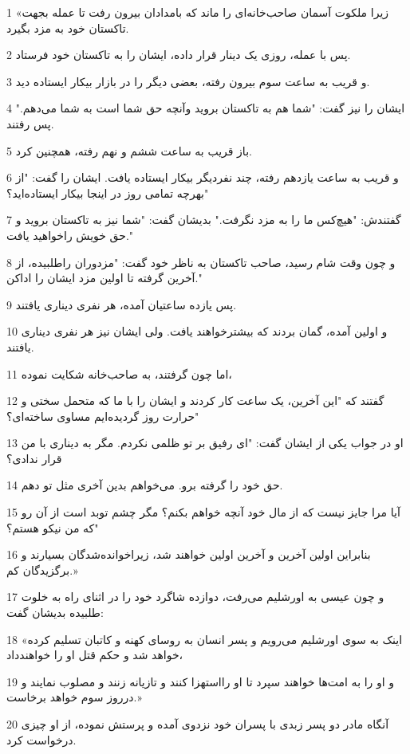 \par 1 «زیرا ملکوت آسمان صاحب‌خانه‌ای را ماند که بامدادان بیرون رفت تا عمله بجهت تاکستان خود به مزد بگیرد.
\par 2 پس با عمله، روزی یک دینار قرار داده، ایشان را به تاکستان خود فرستاد.
\par 3 و قریب به ساعت سوم بیرون رفته، بعضی دیگر را در بازار بیکار ایستاده دید.
\par 4 ایشان را نیز گفت: "شما هم به تاکستان بروید وآنچه حق شما است به شما می‌دهم." پس رفتند.
\par 5 باز قریب به ساعت ششم و نهم رفته، همچنین کرد.
\par 6 و قریب به ساعت یازدهم رفته، چند نفردیگر بیکار ایستاده یافت. ایشان را گفت: "از بهرچه تمامی روز در اینجا بیکار ایستاده‌اید؟"
\par 7 گفتندش: "هیچ‌کس ما را به مزد نگرفت." بدیشان گفت: "شما نیز به تاکستان بروید و حق خویش راخواهید یافت."
\par 8 و چون وقت شام رسید، صاحب تاکستان به ناظر خود گفت: "مزدوران راطلبیده، از آخرین گرفته تا اولین مزد ایشان را اداکن."
\par 9 پس یازده ساعتیان آمده، هر نفری دیناری یافتند.
\par 10 و اولین آمده، گمان بردند که بیشترخواهند یافت. ولی ایشان نیز هر نفری دیناری یافتند.
\par 11 اما چون گرفتند، به صاحب‌خانه شکایت نموده،
\par 12 گفتند که "این آخرین، یک ساعت کار کردند و ایشان را با ما که متحمل سختی و حرارت روز گردیده‌ایم مساوی ساخته‌ای؟"
\par 13 او در جواب یکی از ایشان گفت: "ای رفیق بر تو ظلمی نکردم. مگر به دیناری با من قرار ندادی؟
\par 14 حق خود را گرفته برو. می‌خواهم بدین آخری مثل تو دهم.
\par 15 آیا مرا جایز نیست که از مال خود آنچه خواهم بکنم؟ مگر چشم توبد است از آن رو که من نیکو هستم؟"
\par 16 بنابراین اولین آخرین و آخرین اولین خواهند شد، زیراخوانده‌شدگان بسیارند و برگزیدگان کم.»
\par 17 و چون عیسی به اورشلیم می‌رفت، دوازده شاگرد خود را در اثنای راه به خلوت طلبیده بدیشان گفت:
\par 18 «اینک به سوی اورشلیم می‌رویم و پسر انسان به روسای کهنه و کاتبان تسلیم کرده خواهد شد و حکم قتل او را خواهندداد،
\par 19 و او را به امت‌ها خواهند سپرد تا او رااستهزا کنند و تازیانه زنند و مصلوب نمایند و درروز سوم خواهد برخاست.»
\par 20 آنگاه مادر دو پسر زبدی با پسران خود نزدوی آمده و پرستش نموده، از او چیزی درخواست کرد.
